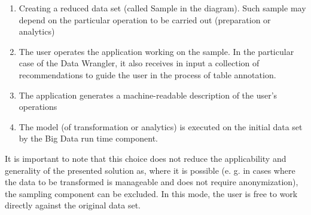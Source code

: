 \begin{enumerate}
    \item Creating a reduced data set (called Sample in the diagram). Such sample may depend on the particular operation to be carried out (preparation or analytics)
    \item 	The user operates the application working on the sample. In the particular case of the Data Wrangler, it also receives in input a collection of recommendations to guide the user in the process of table annotation.
    \item The application generates a machine-readable description of the user's operations
    \item The model (of transformation or analytics) is executed on the initial data set by the Big Data run time component.
\end{enumerate}

It is important to note that this choice does not reduce the applicability and generality of the presented solution as, where it is possible (e. g. in cases where the data to be transformed is manageable and does not require anonymization), the sampling component can be excluded. In this mode, the user is free to work directly against the original data set. 